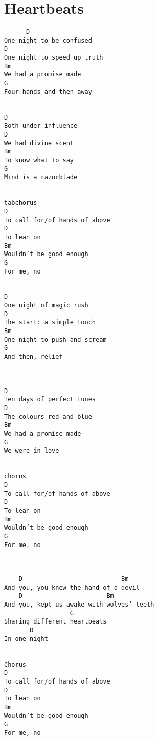 \documentclass[leqno]{memoir}
\begin{document}
\chapter{Heartbeats}
\begin{verbatim}
	  D 
One night to be confused 
D 
One night to speed up truth 
Bm 
We had a promise made 
G 
Four hands and then away 


D 
Both under influence 
D 
We had divine scent 
Bm 
To know what to say 
G 
Mind is a razorblade 


tabchorus
D 
To call for/of hands of above 
D
To lean on
Bm
Wouldn’t be good enough
G
For me, no


D 
One night of magic rush 
D 
The start: a simple touch 
Bm 
One night to push and scream 
G 
And then, relief 



D 
Ten days of perfect tunes 
D 
The colours red and blue 
Bm 
We had a promise made 
G 
We were in love 


chorus
D
To call for/of hands of above
D
To lean on
Bm
Wouldn’t be good enough
G
For me, no



    D                           Bm 
And you, you knew the hand of a devil 
    D                       Bm 
And you, kept us awake with wolves’ teeth 
                  G 
Sharing different heartbeats 
       D 
In one night 


Chorus
D
To call for/of hands of above
D
To lean on
Bm
Wouldn’t be good enough
G
For me, no 
\end{verbatim}
\newpage
\end{document}
